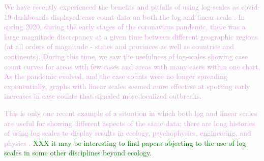 \documentclass[]{interact}
\theoremstyle{plain}%
\theoremstyle{definition}
\theoremstyle{remark}
\begin{document}
\textcolor{Plum}{We have recently experienced the benefits and pitfalls of using log-scales as covid-19 dashboards displayed case count data on both the log and linear scale \citep{wade_fagen_ulmschneider_2020}. 
In spring 2020, during the early stages of the coronavirus pandemic, there was a large magnitude discrepancy at a given time between different geographic regions (at all orders of magnitude - states and provinces as well as countries and continents). 
During this time, we saw the usefulness of log-scales showing case count curves for areas with few cases and areas with many cases within one chart.
As the pandemic evolved, and the case counts were no longer spreading exponentially, graphs with linear scales seemed more effective at spotting early increases in case counts that signaled more localized outbreaks.
}

\textcolor{Plum}{
This is only one recent example of a situation in which both log and linear scales are useful for showing different aspects of the same data; there are long histories of using log scales to display results in ecology, psychophysics, engineering, and physics 
\citep{xkcd, menge_logarithmic_2018}.
}
\textcolor{Green}{XXX it may be interesting to find papers objecting to the use of log scales in some other disciplines beyond ecology.}
\end{document}
